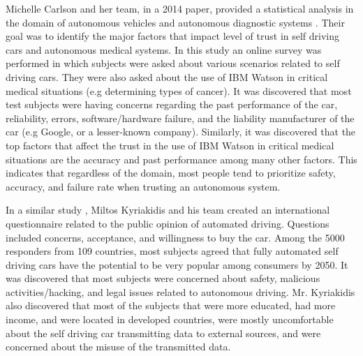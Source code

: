 \documentclass[runningheads,a4paper]{llncs}
\begin{document}
Michelle Carlson and her team, in a 2014 paper, provided a statistical analysis in the domain of autonomous vehicles and autonomous diagnostic systems \cite{carlson2014identifying}. Their goal was to identify the major factors that impact level of trust in self driving cars and autonomous medical systems. In this study an online survey was performed in which subjects were asked about various scenarios related to self driving cars. They were also asked about the use of IBM Watson in critical medical situations (e.g determining types of cancer). It was discovered that most test subjects were having concerns regarding the past performance of the car, reliability, errors, software/hardware failure, and the liability manufacturer of the car (e.g Google, or a lesser-known company). Similarly, it was discovered that the top factors that affect the trust in the use of IBM Watson in critical medical situations are the accuracy and past performance among many other factors. This indicates that regardless of the domain, most people tend to prioritize safety, accuracy, and failure rate when trusting an autonomous system.

In a similar study \cite{kyriakidis2015public}, Miltos Kyriakidis and his team created an international questionnaire related to the public opinion of automated driving. Questions included concerns, acceptance, and willingness to buy the car. Among the 5000 responders from 109 countries, most subjects agreed that fully automated self driving cars have the potential to be very popular among consumers by 2050. It was discovered that most subjects were concerned about safety, malicious activities/hacking, and legal issues related to autonomous driving. Mr. Kyriakidis also discovered that most of the subjects that were more educated, had more income, and were located in developed countries, were mostly uncomfortable about the self driving car transmitting data to external sources, and were concerned about the misuse of the transmitted data.
\end{document}
